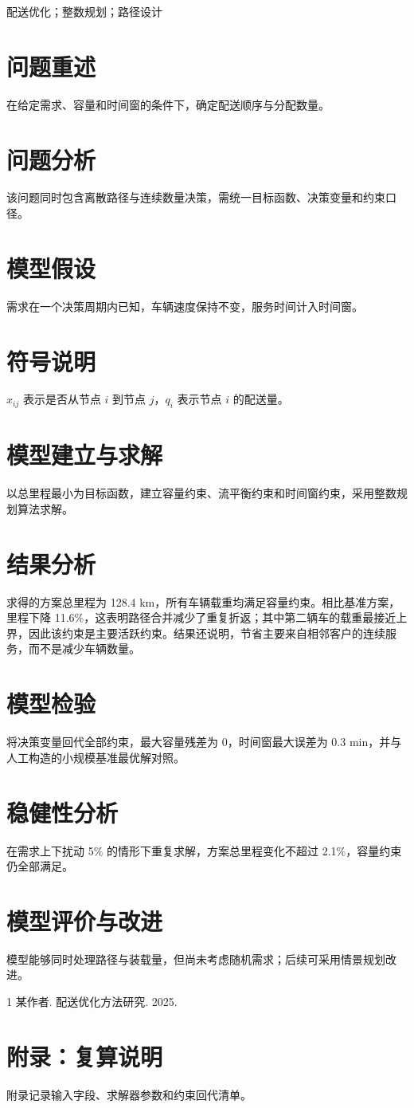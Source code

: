 \documentclass{article}
\begin{document}
\begin{abstract}
本文研究带容量约束的配送优化问题，并给出可复算的求解与检验结果。
\end{abstract}
\newcommand{\keywords}[1]{#1}
\keywords{配送优化；整数规划；路径设计}

\section{问题重述}
在给定需求、容量和时间窗的条件下，确定配送顺序与分配数量。

\section{问题分析}
该问题同时包含离散路径与连续数量决策，需统一目标函数、决策变量和约束口径。

\section{模型假设}
需求在一个决策周期内已知，车辆速度保持不变，服务时间计入时间窗。

\section{符号说明}
$x_{ij}$ 表示是否从节点 $i$ 到节点 $j$，$q_i$ 表示节点 $i$ 的配送量。

\section{模型建立与求解}
以总里程最小为目标函数，建立容量约束、流平衡约束和时间窗约束，采用整数规划算法求解。

\section{结果分析}
求得的方案总里程为 128.4 km，所有车辆载重均满足容量约束。相比基准方案，里程下降 11.6\%，这表明路径合并减少了重复折返；其中第二辆车的载重最接近上界，因此该约束是主要活跃约束。结果还说明，节省主要来自相邻客户的连续服务，而不是减少车辆数量。

\section{模型检验}
将决策变量回代全部约束，最大容量残差为 0，时间窗最大误差为 0.3 min，并与人工构造的小规模基准最优解对照。

\section{稳健性分析}
在需求上下扰动 5\% 的情形下重复求解，方案总里程变化不超过 2.1\%，容量约束仍全部满足。

\section{模型评价与改进}
模型能够同时处理路径与装载量，但尚未考虑随机需求；后续可采用情景规划改进。

\begin{thebibliography}{1}
 某作者. 配送优化方法研究. 2025.
\end{thebibliography}

\appendix
\section{附录：复算说明}
附录记录输入字段、求解器参数和约束回代清单。
\end{document}

